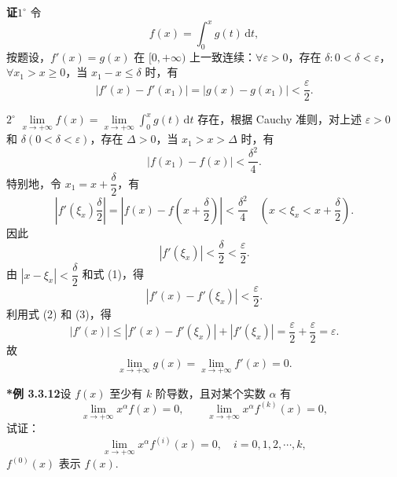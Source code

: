 \documentclass[UTF8, 12pt, fontset=fandol, oneside]{ctexart}
\begin{document}
\noindent\textbf{证}\quad $1^\circ$ 令
\[
  f(x)=\int_0^xg(t)\,\mathrm dt,
\]
按题设，$f'(x)=g(x)$ 在 $[0,+\infty)$ 上一致连续：$\forall\varepsilon>0$，存在 $\delta:0<\delta<\varepsilon$，$\forall x_1>x\ge0$，当 $x_1-x\le\delta$ 时，有
\[
  |f'(x)-f'(x_1)|=|g(x)-g(x_1)|<\frac{\varepsilon}{2}. \tag{1}
\]

$2^\circ$ $\lim\limits_{x\to+\infty}f(x)=\lim\limits_{x\to+\infty}\int_0^xg(t)\,\mathrm dt$ 存在，根据 Cauchy 准则，对上述 $\varepsilon>0$ 和 $\delta(0<\delta<\varepsilon)$，存在 $\Delta>0$，当 $x_1>x>\Delta$ 时，有
\[
  |f(x_1)-f(x)|<\frac{\delta^2}{4}.
\]
特别地，令 $x_1=x+\dfrac{\delta}{2}$，有
\[
  \left|f'(\xi_x)\frac{\delta}{2}\right|
  =\left|f(x)-f\left(x+\frac{\delta}{2}\right)\right|
  <\frac{\delta^2}{4}
  \quad\left(x<\xi_x<x+\frac{\delta}{2}\right).
\]
因此
\[
  |f'(\xi_x)|<\frac{\delta}{2}<\frac{\varepsilon}{2}. \tag{2}
\]
由 $|x-\xi_x|<\dfrac{\delta}{2}$ 和式 (1)，得
\[
  |f'(x)-f'(\xi_x)|<\frac{\varepsilon}{2}. \tag{3}
\]
利用式 (2) 和 (3)，得
\[
  |f'(x)|\le |f'(x)-f'(\xi_x)|+|f'(\xi_x)|=\frac{\varepsilon}{2}+\frac{\varepsilon}{2}=\varepsilon.
\]
故
\[
  \lim_{x\to+\infty}g(x)=\lim_{x\to+\infty}f'(x)=0.
\]

\noindent\textbf{*例 3.3.12}\quad 设 $f(x)$ 至少有 $k$ 阶导数，且对某个实数 $\alpha$ 有
\[
  \lim_{x\to+\infty}x^\alpha f(x)=0,\qquad
  \lim_{x\to+\infty}x^\alpha f^{(k)}(x)=0, \tag{1}
\]
试证：
\[
  \lim_{x\to+\infty}x^\alpha f^{(i)}(x)=0,\quad i=0,1,2,\cdots,k,
\]
$f^{(0)}(x)$ 表示 $f(x)$.
\end{document}

